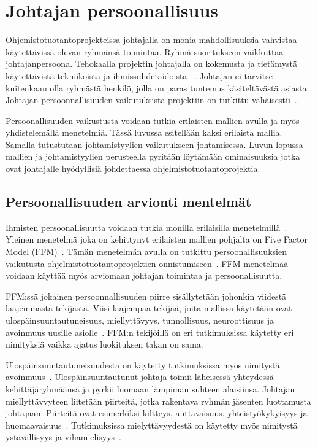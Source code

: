 \documentclass[finnish]{tktltiki2}
\theoremstyle{definition}
\theoremstyle{remark}
\begin{document}
\section{Johtajan persoonallisuus}

Ohjemistotuotantoprojekteissa johtajalla on monia mahdollisuuksia vahvistaa käytettävissä olevan ryhmänsä toimintaa. Ryhmä suoritukseen vaikkuttaa johtajanpersoona. Tehokaalla projektin johtajalla on kokemusta ja tietämystä käytettävistä tekniikoista ja ihmissuhdetaidoista ~\cite{McLeod:2011:FAS:1978802.1978803}. Johtajan ei tarvitse kuitenkaan olla ryhmästä henkilö, jolla on paras tuntemus käsiteltävästä asiasta~\cite{4017705}. Johtajan persoonnallisuuden vaikutuksista projektiin on tutkittu vähäisestii~\cite{Wang:2009:PMP:1639950.1640049}. 

Persoonallisuuden vaikustusta voidaan tutkia erilaisten mallien avulla ja myös yhdistelemällä menetelmiä. Tässä luvussa esitellään kaksi erilaista mallia. Samalla tutustutaan johtamistyylien vaikutukseen johtamisessa. Luvun lopussa mallien ja johtamistyylien perusteella pyritään löytämään ominaisuuksia jotka ovat johtajalle hyödyllisiä johdettaessa ohjelmistotuotantoprojektia.  


\subsection{Persoonallisuuden arvionti mentelmät}

Ihmisten persoonallisuutta voidaan tutkia monilla erilaisilla menetelmillä~\cite{digman1990personality}. Yleinen menetelmä joka on kehittynyt erilaisten mallien pohjalta on Five Factor Model (FFM)~\cite{digman1990personality, barrick2006big}. Tämän menetelmän avulla on tutkittu persoonallisuuksien vaikutusta ohjelmistotuotantoprojektien onnistumiseen~\cite{Wang:2009:PMP:1639950.1640049}. FFM menetelmää voidaan käyttää myös arviomaan johtajan toimintaa ja persoonallisuutta.

FFM:ssä jokainen persoonnallisuuden piirre sisällytetään johonkin viidestä laajemmasta tekijästä. Viisi laajempaa tekijää, joita mallissa käytetään ovat  ulospäinsuuntautuneisuus, miellyttävyys, tunnollisuus, neuroottisuus ja avoinmuus uusille asiolle~\cite{barrick2006big, digman1990personality}. FFM:n tekijöillä on eri tutkimuksissa käytetty eri nimityksiä vaikka ajatus luokituksen takan on sama.  

Ulospäinsuuntautuneisuudesta  on käytetty tutkimuksissa myös nimitystä avoinmuus~\cite{digman1990personality}. Ulospäinsuuntautunut johtaja toimii läheisessä yhteydessä kehittäjäryhmäänsä ja pyrkii luomaan lämpimän suhteen alaisiinsa.
Johtajan miellyttävyyteen liitetään piirteitä, jotka rakentava  ryhmän jäsenten luottamusta johtajaan. Piirteitä ovat esimerkiksi kiltteys, auttavaisuus, yhteistyökykyisyys ja huomaavaisuus~\cite{Wang:2009:PMP:1639950.1640049}. Tutkimuksissa mielyttävyydestä on käytetty myös nimitystä ystävällisyys ja vihamielisyys~\cite{digman1990personality}. 
\end{document}
